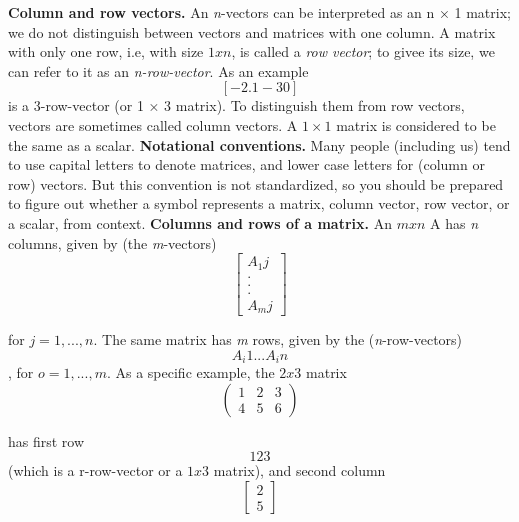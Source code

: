 \documentclass[11pt,oneside,a4paper,openright]{article}
\begin{document}
\newline\newline
\textbf{Column and row vectors.} An \emph{n}-vectors can be interpreted as an n × 1 matrix; we do not distinguish between vectors and matrices with one column. 
A matrix with only one row, i.e, with size $1 x n$, is called a \emph{row vector}; to givee its size, we can refer to it as an \emph{n-row-vector}. As an example
\[[-2.1 -3 0]\] 
is a 3-row-vector (or 1 × 3 matrix). To distinguish them from row vectors, vectors are sometimes called column vectors. A $1 × 1$ matrix is considered to be the same
as a scalar.
\newline\newline
\textbf{Notational conventions.} Many people (including us) tend to use capital letters
to denote matrices, and lower case letters for (column or row) vectors. But this
convention is not standardized, so you should be prepared to figure out whether
a symbol represents a matrix, column vector, row vector, or a scalar, from context.
\newline\newline
\textbf{Columns and rows of a matrix.} An $m x n$ A has \emph{n} columns, given by (the \emph{m}-vectors)
\begin{equation}
\begin{bmatrix}
    A_1j \\
    . \\
    . \\
    . \\
    A_mj 
\end{bmatrix}    
\end{equation}

for $j = 1, ..., n$. The same matrix has \emph{m} rows, given by the (\emph{n}-row-vectors)
\[A_i1 ... A_in\],
for $o = 1, ..., m$. \newline
As a specific example, the $2 x 3$ matrix
\begin{equation}
\begin{pmatrix}
    1 & 2 & 3 \\
    4 & 5 & 6 
\end{pmatrix}    
\end{equation}

has first row
\[1 2 3\]
(which is a r-row-vector or a $1 x 3$ matrix), and second column
\begin{equation}
\begin{bmatrix}
    2 \\
    5 
    \end{bmatrix}    
\end{equation}
\end{document}
